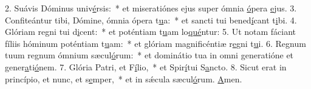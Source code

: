 2. Suávis Dóminus univ\uline{é}rsis:~* et miseratiónes ejus super ómnia \uline{ó}pera \uline{e}jus.
3. Confiteántur tibi, Dómine, ómnia ópera t\uline{u}a:~* et sancti tui bened\uline{í}cant t\uline{i}bi.
4. Glóriam regni tui d\uline{i}cent:~* et poténtiam t\uline{u}am lo\uline{qué}ntur:
5. Ut notam fáciant fíliis hóminum poténtiam t\uline{u}am:~* et glóriam magnificéntiæ r\uline{e}gni t\uline{u}i.
6. Regnum tuum regnum ómnium sæcul\uline{ó}rum:~* et dominátio tua in omni generatióne et gener\uline{a}ti\uline{ó}nem.
7. Glória Patri, et F\uline{í}lio,~* et Spir\uline{í}tui S\uline{a}ncto.
8. Sicut erat in princípio, et nunc, et s\uline{e}mper,~* et in sǽcula sæcul\uline{ó}rum. \uline{A}men.
